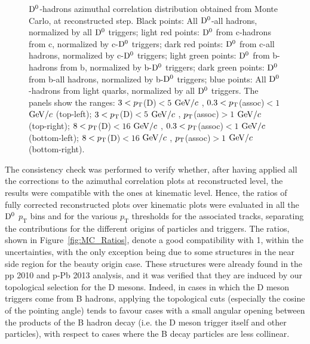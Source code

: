 \begin{figure}
\caption{${\rm D^0}$-hadrons azimuthal correlation distribution obtained from Monte Carlo, at reconstructed step. Black points: All ${\rm D^0}$-all hadrons, normalized by all ${\rm D^0}$ triggers; light red points: ${\rm D^0}$ from c-hadrons from c, normalized by c-${\rm D^0}$ triggers; dark red points: ${\rm D^0}$ from c-all hadrons, normalized by c-${\rm D^0}$ triggers; light green points: ${\rm D^0}$ from b-hadrons from b, normalized by b-${\rm D^0}$ triggers; dark green points: ${\rm D^0}$ from b-all hadrons, normalized by b-${\rm D^0}$ triggers; blue points: All ${\rm D^0}$-hadrons from light quarks, normalized by all ${\rm D^0}$ triggers.
The panels show the ranges: $3 < p_{\rm T}$(D)$ < 5$ $\mathrm{GeV}/c$ , $0.3 < p_{\rm T}$(assoc)$ < 1$ $\mathrm{GeV}/c$  (top-left); $3 < p_{\rm T}$(D)$ < 5$ $\mathrm{GeV}/c$ , $p_{\rm T}$(assoc)$ > 1$ $\mathrm{GeV}/c$  (top-right); $8 < p_{\rm T}$(D)$ < 16$ $\mathrm{GeV}/c$ , $0.3 < p_{\rm T}$(assoc)$ < 1$ $\mathrm{GeV}/c$  (bottom-left); $8 < p_{\rm T}$(D)$ < 16$ $\mathrm{GeV}/c$ , $p_{\rm T}$(assoc)$ > 1$ $\mathrm{GeV}/c$  (bottom-right).}
\label{fig:MC_Reco}
\end{figure}

The consistency check was performed to verify whether, after having applied all the corrections to the azimuthal correlation plots at reconstructed level, the results were compatible with the ones at kinematic level. Hence, the ratios of fully corrected reconstructed plots over kinematic plots were evaluated in all the ${\rm D^0}$ $p_\text{T}$ bins and for the various $p_\text{T}$ thresholds for the associated tracks, separating the contributions for the different origins of particles and triggers. The ratios, shown in Figure~\ref{fig:MC_Ratios}, denote a good compatibility with 1, within the uncertainties, with the only exception being due to some structures in the near side region for the beauty origin case.
These structures were already found in the pp 2010 and p-Pb 2013 analysis, and it was verified that they are induced by our topological selection for the D mesons. Indeed, in cases in which the D meson triggers come from B hadrons, applying the topological cuts (especially the cosine of the pointing angle) tends to favour cases with a small angular opening between the products of the B hadron decay (i.e. the D meson trigger itself and other particles), with respect to cases where the B decay particles are less collinear.

